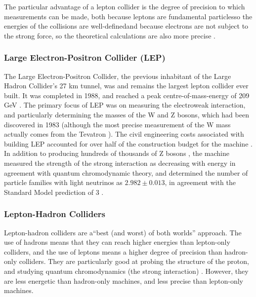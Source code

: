 The particular advantage of a lepton collider is the degree of precision to which measurements can be made, both because leptons are fundamental particles\textendash so the energies of the collisions are well-defined\textendash and because electrons are not subject to the strong force, so the theoretical calculations are also more precise \cite{Thorne:Interview}.

\subsubsection{Large Electron-Positron Collider (LEP)}
The Large Electron-Positron Collider, the previous inhabitant of the Large Hadron Collider's 27 km tunnel, was and remains the largest lepton collider ever built. It was completed in 1988, and reached a peak centre-of-mass-energy of 209 GeV \cite{CERN:LEP:Online}. The primary focus of LEP was on measuring the electroweak interaction, and particularly determining the masses of the W and Z bosons, which had been discovered in 1983 (although the most precise measurement of the W mass actually comes from the Tevatron \cite{Butterworth:Interview}). The civil engineering costs associated with building LEP accounted for over half of the construction budget for the machine \cite{LEP:History:Online}. In addition to producing hundreds of thousands of Z bosons \cite{LEP:History:Online}, the machine measured the strength of the strong interaction as decreasing with energy in agreement with quantum chromodynamic theory, and determined the number of particle families with light neutrinos as $2.982\pm 0.013$, in agreement with the Standard Model prediction of 3 \cite{ALEPH:Physics:Online}.

\subsubsection{Lepton-Hadron Colliders}
Lepton-hadron colliders are a``best (and worst) of both worlds'' approach. The use of hadrons means that they can reach higher energies than lepton-only colliders, and the use of leptons means a higher degree of precision than hadron-only colliders. They are particularly good at probing the structure of the proton, and studying quantum chromodynamics (the strong interaction) \cite{Waters:Interview,Thorne:Interview,Butterworth:Interview}. However, they are less energetic than hadron-only machines, and less precise than lepton-only machines.


